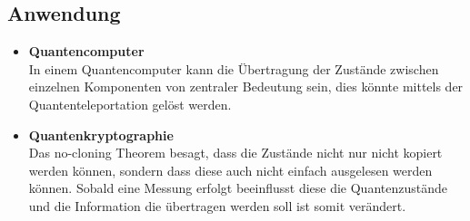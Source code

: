 \begin{refsection}
\section{Anwendung}
	\begin{itemize}
		\item{\textbf{Quantencomputer} \\
			In einem Quantencomputer kann die Übertragung der Zustände zwischen einzelnen Komponenten von zentraler Bedeutung sein, dies könnte mittels der Quantenteleportation gelöst werden.
		}
		\item{\textbf{Quantenkryptographie} \\
			Das no-cloning Theorem besagt, dass die Zustände  nicht nur nicht kopiert werden können, sondern dass diese auch nicht einfach ausgelesen werden können. Sobald eine Messung erfolgt beeinflusst diese die Quantenzustände und die Information die übertragen werden soll ist somit verändert.
		}		
	\end{itemize}
\printbibliography[heading=subbibliography]
\end{refsection}